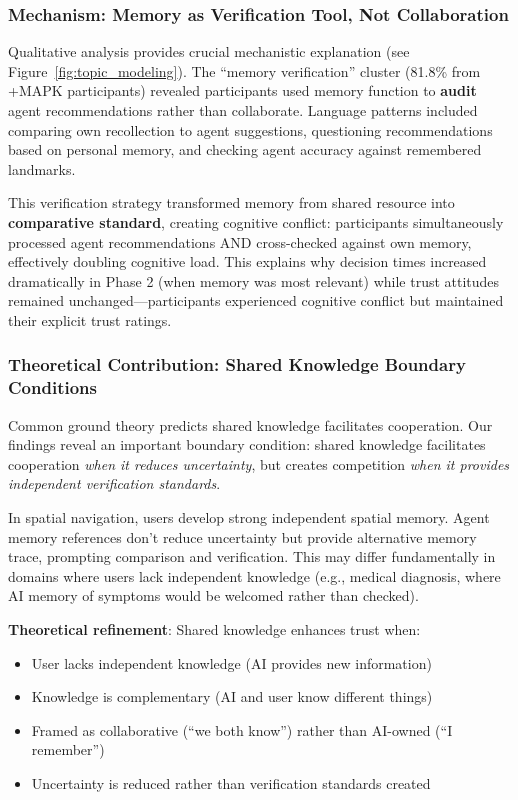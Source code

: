 \documentclass[12pt]{article}
\begin{document}
\subsubsection{Mechanism: Memory as Verification Tool, Not Collaboration}

Qualitative analysis provides crucial mechanistic explanation (see Figure~\ref{fig:topic_modeling}). The ``memory verification'' cluster (81.8\% from +MAPK participants) revealed participants used memory function to \textbf{audit} agent recommendations rather than collaborate. Language patterns included comparing own recollection to agent suggestions, questioning recommendations based on personal memory, and checking agent accuracy against remembered landmarks.

This verification strategy transformed memory from shared resource into \textbf{comparative standard}, creating cognitive conflict: participants simultaneously processed agent recommendations AND cross-checked against own memory, effectively doubling cognitive load. This explains why decision times increased dramatically in Phase 2 (when memory was most relevant) while trust attitudes remained unchanged—participants experienced cognitive conflict but maintained their explicit trust ratings.

\subsubsection{Theoretical Contribution: Shared Knowledge Boundary Conditions}

Common ground theory \citep{clark1991grounding} predicts shared knowledge facilitates cooperation. Our findings reveal an important boundary condition: shared knowledge facilitates cooperation \textit{when it reduces uncertainty}, but creates competition \textit{when it provides independent verification standards}.

In spatial navigation, users develop strong independent spatial memory. Agent memory references don't reduce uncertainty but provide alternative memory trace, prompting comparison and verification. This may differ fundamentally in domains where users lack independent knowledge (e.g., medical diagnosis, where AI memory of symptoms would be welcomed rather than checked).

\textbf{Theoretical refinement}: Shared knowledge enhances trust when:
\begin{itemize}
    \item User lacks independent knowledge (AI provides new information)
    \item Knowledge is complementary (AI and user know different things)
    \item Framed as collaborative (``we both know'') rather than AI-owned (``I remember'')
    \item Uncertainty is reduced rather than verification standards created
\end{itemize}
\end{document}
